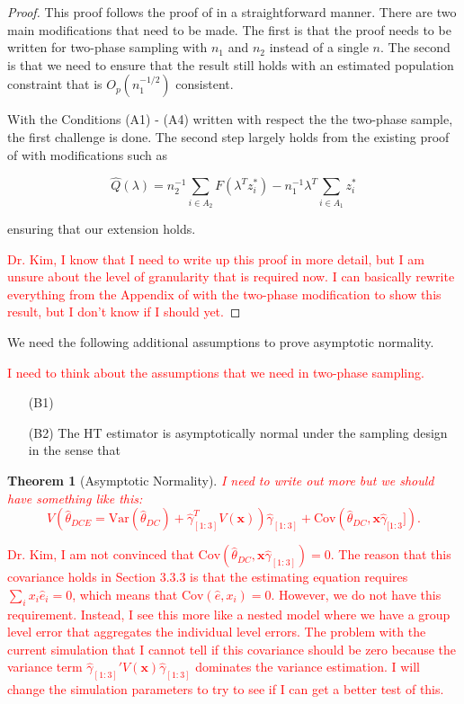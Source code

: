 \documentclass[12pt]{article}
\newtheorem{theorem}{Theorem}
\newcommand{\Cov}{{\text{Cov}}}
\newcommand{\Var}{{\text{Var}}}
\renewcommand{\bf}[1]{\mathbf{#1}}
\begin{document}
\begin{proof}
  This proof follows the proof of \cite{kwon2024debiased} in a straightforward
  manner. There are two main modifications that need to be made. The first is
  that the proof needs to be written for two-phase sampling with $n_1$ and $n_2$
  instead of a single $n$. The second is that we need to ensure that the result
  still holds with an estimated population constraint that is $O_p(n_1^{-1/2})$
  consistent.

  With the Conditions (A1) - (A4) written with respect the the two-phase sample,
  the first challenge is done. The second step largely holds from the existing
  proof of \cite{kwon2024debiased} with modifications such as 

  $$\hat Q(\lambda) = n_2^{-1} \sum_{i \in A_2} F(\lambda^T z_i^*) - n_1^{-1}
  \lambda^T \sum_{i \in A_1} z_i^*$$ 

  ensuring that our extension holds.

  \textcolor{red}{Dr. Kim, I know that I need to write up this proof in more
  detail, but I am unsure about the level of granularity that is required now. I
  can basically rewrite everything from the Appendix of \cite{kwon2024debiased}
  with the two-phase modification to show this result, but I don't know if I
  should yet.}
\end{proof}

We need the following additional assumptions to prove asymptotic normality.

\textcolor{red}{I need to think about the assumptions that we need in two-phase
sampling.}
\begin{itemize}
  \item[(B1)] 
  \item[(B2)] The HT estimator is asymptotically normal under the sampling
    design in the sense that 

\end{itemize}

\begin{theorem}[Asymptotic Normality]
\textcolor{red}{I need to write out more but we should have something like this:
  $$V(\hat \theta_{DCE} = \Var(\hat \theta_{DC}) + \hat \gamma_{[1:3]}^T V(\bf
x)) \hat \gamma_{[1:3]} + \Cov(\hat \theta_{DC}, \bf x \hat \gamma_{[1:3}]).$$}
\end{theorem}

\textcolor{red}{Dr. Kim, I am not convinced that $\Cov(\hat \theta_{DC}, \bf x
\hat \gamma_{[1:3]}) = 0$. The reason that this covariance holds in
\cite{fuller2009sampling} Section 3.3.3 is that the estimating equation requires
$\sum_i x_i \hat e_i = 0$, which means that $\Cov(\hat e, x_i) = 0$. However, we
do not have this requirement. Instead, I see this more like a nested model where
we have a group level error that aggregates the individual level errors. The
problem with the current simulation that I cannot tell if this covariance should
be zero because the variance term $\hat \gamma_{[1:3]}'V(\bf x) \hat \gamma_{[1:3]}$
dominates the variance estimation. I will change the simulation parameters to
try to see if I can get a better test of this.}
\end{document}
